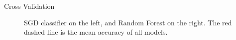 \documentclass{beamer}
\begin{document}
\begin{frame}{Cross Validation}
\begin{figure}[H]
\centering
\begin{minipage}[b]{0.47\textwidth}
\end{minipage}
\hfill
\begin{minipage}[b]{0.47\textwidth}
\end{minipage}
\caption{SGD classifier on the left, and Random Forest on the right. The red
dashed line is the mean accuracy of all models.}
\end{figure}
\end{frame}
\end{document}

